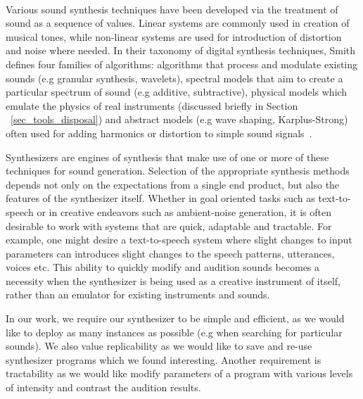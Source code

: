 \documentclass[\main/thesis.tex]{subfiles}
\begin{document}
\\

Various sound synthesis techniques have been developed via the treatment of sound as a sequence of values. Linear systems are commonly used in creation of musical tones, while non-linear systems are used for introduction of distortion and noise where needed. In their taxonomy of digital synthesis techniques, Smith defines four families of algorithms: algorithms that process and modulate existing sounds (e.g granular synthesis, wavelets), spectral models that aim to create a particular spectrum of sound (e.g additive, subtractive), physical models which emulate the physics of real instruments (discussed briefly in Section ~\ref{sec_tools_disposal}) and abstract models (e.g wave shaping, Karplus-Strong) often used for adding harmonics or distortion to simple sound signals~\cite{smith1991viewpoints}. 

Synthesizers are engines of synthesis that make use of one or more of these techniques for sound generation. Selection of the appropriate synthesis methods depends not only on the expectations from a single end product, but also the features of the synthesizer itself. Whether in goal oriented tasks such as text-to-speech or in creative endeavors such as ambient-noise generation, it is often desirable to work with systems that are quick, adaptable and tractable. For example, one might desire a text-to-speech system where slight changes to input parameters can introduces slight changes to the speech patterns, utterances, voices etc. This ability to quickly modify and audition sounds becomes a necessity when the synthesizer is being used as a creative instrument of itself, rather than an emulator for existing instruments and sounds. 

In our work, we require our synthesizer to be simple and efficient, as we would like to deploy as many instances as possible (e.g when searching for particular sounds). We also value replicability as we would like to save and re-use synthesizer programs which we found interesting. Another requirement is tractability as we would like modify parameters of a program with various levels of intensity and contrast the audition results.
\end{document}
